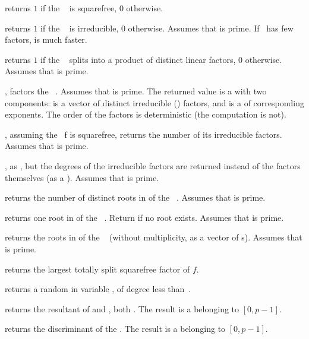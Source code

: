  returns $1$ if the
~ is squarefree, $0$ otherwise.

 returns $1$ if the ~
is irreducible, $0$ otherwise. Assumes that  is prime. If~ has
few factors,  is much faster.

 returns $1$ if the
~ splits into a product of distinct linear factors, $0$
otherwise. Assumes that  is prime.

, factors the ~. Assumes
that  is prime. The returned value  is a  with two
components:  is a vector of distinct irreducible ()
factors, and  is a  of corresponding exponents. The
order of the factors is deterministic (the computation is not).

, assuming the ~f is squarefree,
returns the number of its irreducible factors. Assumes that  is prime.

, as , but the
degrees of the irreducible factors are returned instead of the factors
themselves (as a ). Assumes that  is prime.

 returns the number of distinct
roots in  of the ~. Assumes that  is prime.

 returns one root in  of
the ~. Return  if no root exists.
Assumes that  is prime.

 returns the roots in  of
the ~ (without multiplicity, as a vector of s).
Assumes that  is prime.

 returns the largest totally split
squarefree factor of $f$.

 returns a random 
in variable , of degree less than~.

 returns the resultant
of  and , both . The result is a 
belonging to $[0,p-1]$.

 returns the discriminant
of the  . The result is a  belonging to $[0,p-1]$.

